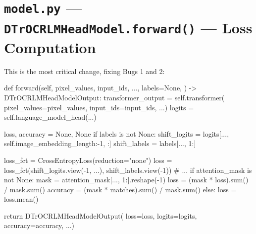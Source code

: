 \documentclass[11pt, a4paper]{report}
\begin{document}
\section{\texttt{model.py} --- \texttt{DTrOCRLMHeadModel.forward()} --- Loss Computation}
\label{sec:code-model-lm}

This is the most critical change, fixing Bugs 1 and 2:

\begin{minipage}[t]{0.48\textwidth}
\begin{originalcode}
def forward(self, pixel_values, input_ids,
    ..., labels=None,
) -> DTrOCRLMHeadModelOutput:
    transformer_output = self.transformer(
      pixel_values=pixel_values,
      input_ids=input_ids, ...)
    logits = self.language_model_head(...)

    loss, accuracy = None, None
    if labels is not None:
      shift_logits = logits[...,
        self.image_embedding_length:-1, :]
      shift_labels = labels[..., 1:]

      loss_fct = CrossEntropyLoss(reduction="none")
      loss = loss_fct(shift_logits.view(-1, ...),
                      shift_labels.view(-1))
      # ...
      if attention_mask is not None:
        mask = attention_mask[..., 1:].reshape(-1)
        loss = (mask * loss).sum() / mask.sum()
        accuracy = (mask * matches).sum() / mask.sum()
      else:
        loss = loss.mean()

    return DTrOCRLMHeadModelOutput(
      loss=loss, logits=logits,
      accuracy=accuracy, ...)
\end{originalcode}
\end{minipage}
\hfill
\end{document}
